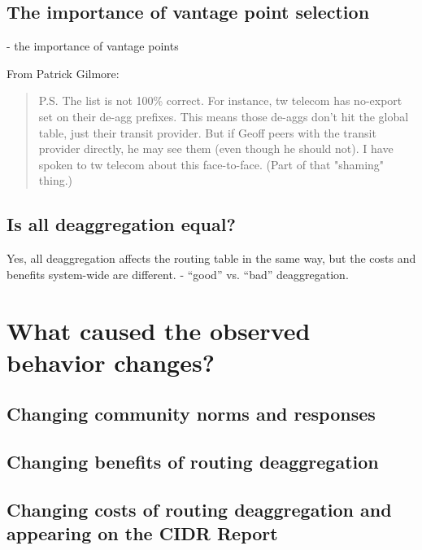 \subsection{The importance of vantage point selection}
- the importance of vantage points

From Patrick Gilmore:

\begin{quote}
P.S. The list is not 100\% correct.  For instance, tw telecom has no-export set on their de-agg prefixes.  This means those de-aggs don't hit the global table, just their transit provider.  But if Geoff peers with the transit provider directly, he may see them (even though he should not).  I have spoken to tw telecom about this face-to-face.  (Part of that "shaming" thing.)
\end{quote}

\subsection{Is all deaggregation equal?}
Yes, all deaggregation affects the routing table in the same way, but the costs and benefits system-wide are different.
- ``good'' vs. ``bad'' deaggregation.

\section{What caused the observed behavior changes?}
\subsection{Changing community norms and responses}
\subsection{Changing benefits of routing deaggregation}
\subsection{Changing costs of routing deaggregation and appearing on the CIDR Report}


